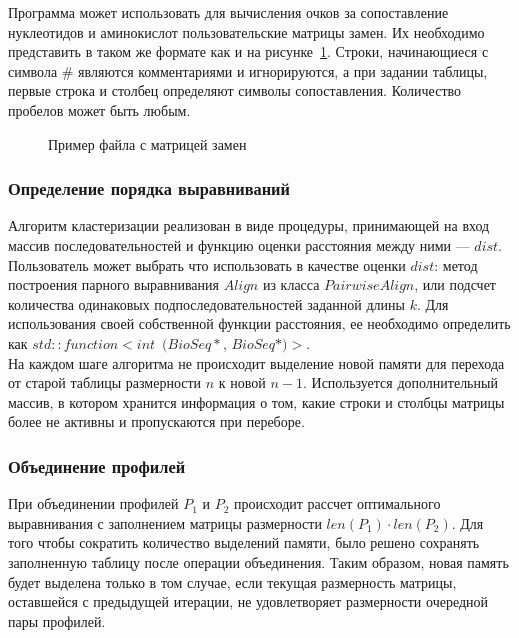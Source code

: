 Программа может использовать для вычисления очков за сопоставление нуклеотидов и аминокислот пользовательские матрицы замен. Их необходимо представить в таком же формате как и на рисунке~\ref{ris:BLOSUM62}.
Строки, начинающиеся с символа $\#$ являются комментариями и игнорируются, а при задании таблицы, первые строка и столбец определяют символы сопоставления. Количество пробелов может быть любым.

\begin{figure}[h]
	\caption{Пример файла с матрицей замен}
	\label{ris:BLOSUM62}
\end{figure}

\subsubsection[Определение порядка выравниваний]{\large Определение порядка выравниваний}
\hspace{\parindent} Алгоритм кластеризации реализован в виде процедуры, принимающей на вход массив последовательностей и функцию оценки расстояния между ними --- $dist$. Пользователь может выбрать что использовать в качестве оценки $dist$: метод построения парного выравнивания $Align$ из класса $PairwiseAlign$, или подсчет количества одинаковых подпоследовательностей заданной длины $k$. Для использования своей собственной функции расстояния, ее необходимо определить как $std::function<int$~$(BioSeq*$, $BioSeq*)>$. \\
\indent На каждом шаге алгоритма не происходит выделение новой памяти для перехода от старой таблицы размерности $n$ к новой $n-1$. Используется дополнительный массив, в котором хранится информация о том, какие строки и столбцы матрицы более не активны и пропускаются при переборе. 

\subsubsection[Объединение профилей]{\large Объединение профилей}
\hspace{\parindent} При объединении профилей $P_1$ и $P_2$ происходит рассчет оптимального выравнивания с заполнением матрицы размерности $len(P_1) \cdot len(P_2)$. Для того чтобы сократить количество выделений памяти, было решено сохранять заполненную таблицу после операции объединения. Таким образом, новая память будет выделена только в том случае, если текущая размерность матрицы, оставшейся с предыдущей итерации, не удовлетворяет размерности очередной пары профилей.

